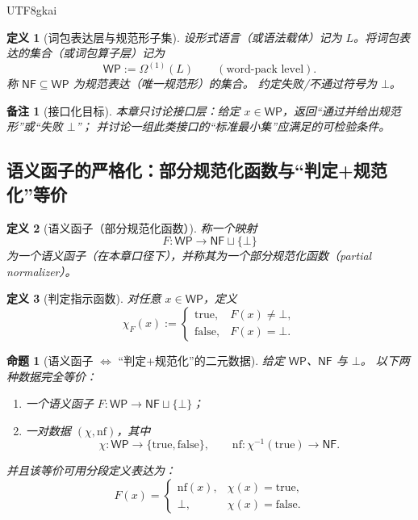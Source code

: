 \documentclass[12pt]{article}
\newtheorem{definition}{定义}[section]
\newtheorem{proposition}{命题}[section]
\newtheorem{remark}{备注}[section]
\begin{document}
\begin{CJK*}{UTF8}{gkai}
\begin{definition}[词包表达层与规范形子集]
设形式语言（或语法载体）记为 $L$。将词包表达的集合（或词包算子层）记为
\[
\mathsf{WP}:=\Omega^{(1)}(L)\qquad(\text{word-pack level}).
\]
称 $\mathsf{NF}\subseteq \mathsf{WP}$ 为规范表达（唯一规范形）的集合。
约定失败/不通过符号为 $\bot$。
\end{definition}

\begin{remark}[接口化目标]
本章只讨论接口层：给定 $x\in \mathsf{WP}$，返回“通过并给出规范形”或“失败 $\bot$”；
并讨论一组此类接口的“标准最小集”应满足的可检验条件。
\end{remark}

\subsection{语义函子的严格化：部分规范化函数与“判定+规范化”等价}
\label{subsec:tex20-semantic-functor-as-partial-normalizer}

\begin{definition}[语义函子（部分规范化函数）]
称一个映射
\[
F:\mathsf{WP}\to \mathsf{NF}\sqcup \{\bot\}
\]
为一个语义函子（在本章口径下），并称其为一个部分规范化函数（partial normalizer）。
\end{definition}

\begin{definition}[判定指示函数]
对任意 $x\in\mathsf{WP}$，定义
\[
\chi_F(x):=
\begin{cases}
\mathrm{true}, & F(x)\neq \bot,\\
\mathrm{false}, & F(x)=\bot.
\end{cases}
\]
\end{definition}

\begin{proposition}[语义函子 $\Longleftrightarrow$ “判定+规范化”的二元数据]
\label{prop:tex20-partial-normalizer-iff}
给定 $\mathsf{WP}$、$\mathsf{NF}$ 与 $\bot$。
以下两种数据完全等价：
\begin{enumerate}
  \item 一个语义函子 $F:\mathsf{WP}\to \mathsf{NF}\sqcup\{\bot\}$；
  \item 一对数据 $(\chi,\mathrm{nf})$，其中
  \[
  \chi:\mathsf{WP}\to \{\mathrm{true},\mathrm{false}\},
  \qquad
  \mathrm{nf}:\chi^{-1}(\mathrm{true})\to \mathsf{NF}.
  \]
\end{enumerate}
并且该等价可用分段定义表达为：
\[
F(x)=
\begin{cases}
\mathrm{nf}(x), & \chi(x)=\mathrm{true},\\
\bot, & \chi(x)=\mathrm{false}.
\end{cases}
\]
\end{proposition}


\end{CJK*}
\end{document}
